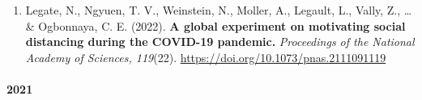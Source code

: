 \documentclass[
  twocolumn]{article}
\providecommand{\tightlist}{%
  \setlength{\itemsep}{0pt}\setlength{\parskip}{0pt}}
\begin{document}
\begin{enumerate}
\begin{enumerate}
\begin{enumerate}
\begin{enumerate}
\begin{enumerate}
\begin{enumerate}
\begin{enumerate}
\begin{enumerate}
\begin{enumerate}
\begin{enumerate}
\begin{enumerate}
                      \begin{enumerate}
                      \def\labelenumxii{\arabic{enumxii}.}
                      \tightlist
                      \item
                        Legate, N., Ngyuen, T. V., Weinstein, N.,
                        Moller, A., Legault, L., Vally, Z., \ldots{} \&
                        Ogbonnaya, C. E. (2022). \textbf{A global
                        experiment on motivating social distancing
                        during the COVID-19 pandemic.} \emph{Proceedings
                        of the National Academy of Sciences, 119}(22).
                        \url{https://doi.org/10.1073/pnas.2111091119}
                      \end{enumerate}
                    \end{enumerate}
                  \end{enumerate}
                \end{enumerate}
              \end{enumerate}
            \end{enumerate}
          \end{enumerate}
        \end{enumerate}
      \end{enumerate}
    \end{enumerate}
  \end{enumerate}
\end{enumerate}

\hypertarget{section-3}{%
\paragraph{2021}\label{section-3}}
\end{document}

